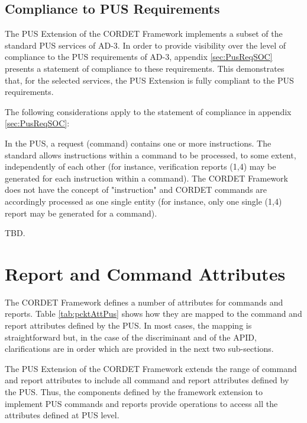 \documentclass[a4paper,10pt]{article}
\let\stdsection\section
\renewcommand\section{\newpage\stdsection}
\newenvironment{fw_itemize}						%
{\begin{itemize}
  \setlength{\itemsep}{1mm}
  \setlength{\parskip}{0pt}
  \setlength{\parsep}{0pt}}
{\end{itemize}}
\begin{document}
\subsection{Compliance to PUS Requirements}\label{sec:ComplianceToPus}
The PUS Extension of the CORDET Framework implements a subset of the standard PUS services of AD-3. In order to provide visibility over the level of compliance to the PUS requirements of AD-3, appendix \ref{sec:PusReqSOC} presents a statement of compliance to these requirements. This demonstrates that, for the selected services, the PUS Extension is fully compliant to the PUS requirements.

The following considerations apply to the statement of compliance in appendix \ref{sec:PusReqSOC}:

\begin{fw_itemize}
\item In the PUS, a request (command) contains one or more instructions. The standard allows instructions within a command to be processed, to some extent, independently of each other (for instance, verification reports (1,4) may be generated for each instruction within a command). The CORDET Framework does not have the concept of "instruction" and CORDET commands are accordingly processed as one single entity (for instance, only one single (1,4) report may be generated for a command).
\item TBD.
\end{fw_itemize}




\section{Report and Command Attributes}\label{sec:repCmdAttr}
The CORDET Framework defines a number of attributes for commands and reports. Table \ref{tab:pcktAttPus} shows how they are mapped to the command and report attributes defined by the PUS. In most cases, the mapping is straightforward but, in the case of the discriminant and of the APID, clarifications are in order which are provided in the next two sub-sections. 

The PUS Extension of the CORDET Framework extends the range of command and report attributes to include all command and report attributes defined by the PUS. Thus, the components defined by the framework extension to implement PUS commands and reports provide operations to access all the attributes defined at PUS level. 
\end{document}
